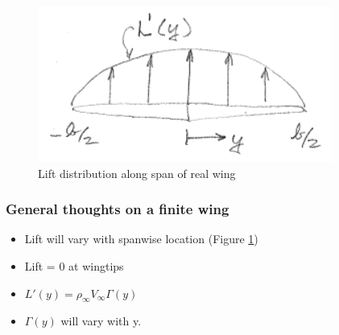 \documentclass[draft=false, titlepage]{article}
\begin{document}
\begin{figure}[ht]
    \centering
    \includegraphics[width=0.4\linewidth]{Figures/liftOverWing.PNG}
    \caption{Lift distribution along span of real wing}
    \label{fig:liftOverWing}
\end{figure}
\subsubsection{General thoughts on a finite wing}
\begin{itemize}
    \item Lift will vary with spanwise location (Figure \ref{fig:liftOverWing})
    \item Lift = 0 at wingtips
    \item $L'(y) = \rho_\infty V_\infty \Gamma(y)$
    \item $\Gamma(y)$ will vary with y.
\end{itemize}
\end{document}
